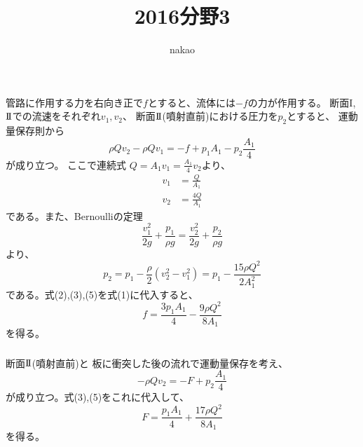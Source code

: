 \documentclass[a4paper]{jsarticle}
\begin{document}
\title{2016分野3}
\author{nakao}
\maketitle

\section{}
\subsection{}
\subsubsection{}
管路に作用する力を右向き正で$f$とすると、流体には$-f$の力が作用する。
断面$\mathrm{I}$,$\mathrm{I}\hspace{-1.2pt}\mathrm{I}$での流速をそれぞれ$v_1, v_2$、
断面$\mathrm{I}\hspace{-1.2pt}\mathrm{I}$(噴射直前)における圧力を$p_2$とすると、
運動量保存則から
\begin{equation}
  \rho Q v_2 - \rho Q v_1 = -f + p_1 A_1 - p_2 \frac{A_1}{4}
\end{equation}
が成り立つ。
ここで連続式
$Q = A_1 v_1 = \frac{A_1}{4} v_2$より、
\begin{align}
  v_1 &= \frac{Q}{A_1} \\
  v_2 &= \frac{4Q}{A_1}
\end{align}
である。また、Bernoulliの定理
\begin{equation}
  \frac{v_1^2}{2g} + \frac{p_1}{\rho g}
  = \frac{v_2^2}{2g} + \frac{p_2}{\rho g}
\end{equation}
より、
\begin{equation}
  p_2 = p_1 - \frac{\rho}{2} (v_2^2 - v_1^2)
  = p_1 - \frac{15 \rho Q^2}{2 A_1^2}
\end{equation}
である。式(2),(3),(5)を式(1)に代入すると、
\begin{equation}
  f = \frac{3 p_1 A_1}{4} - \frac{9 \rho Q^2}{8 A_1}
\end{equation}
を得る。

\subsubsection{}
断面$\mathrm{I}\hspace{-1.2pt}\mathrm{I}$(噴射直前)と
板に衝突した後の流れで運動量保存を考え、
\begin{equation}
  -\rho Q v_2 = -F + p_2 \frac{A_1}{4}
\end{equation}
が成り立つ。式(3),(5)をこれに代入して、
\begin{equation}
  F = \frac{p_1 A_1}{4} + \frac{17 \rho Q^2}{8 A_1}
\end{equation}
を得る。
\end{document}
